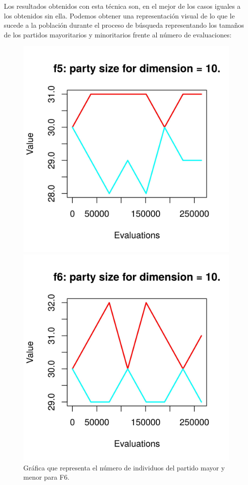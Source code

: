 \documentclass[11pt,a4paper]{article}
\begin{document}
		\noindent Los resultados obtenidos con esta técnica son, en el mejor de los casos iguales a los obtenidos sin ella. Podemos obtener una representación visual de lo que le sucede a la población durante el proceso de búsqueda representando los tamaños de los partidos mayoritarios y minoritarios frente al número de evaluaciones:
		
		\begin{figure}[!h]
			\centering
			\begin{minipage}[b]{0.4\textwidth}
				\includegraphics[width=\textwidth]{Imagenes/f5_percentage_10.jpg}
				\caption{Gráfica que representa el número de individuos del partido mayor y menor para F6.}
			\end{minipage}
			\hfill
			\begin{minipage}[b]{0.4\textwidth}
				\includegraphics[width=\textwidth]{Imagenes/f6_percentage_10.jpg}

\end{minipage}
\end{figure}
\end{document}
